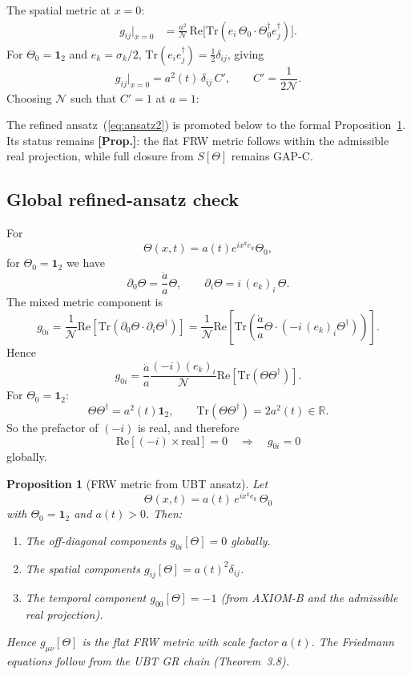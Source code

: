 \documentclass[12pt,a4paper]{article}
\newtheorem{proposition}[theorem]{Proposition}
\begin{document}
The spatial metric at $x = 0$:
\begin{align}
  g_{ij}\big|_{x=0}
  &= \frac{a^2}{\mathcal{N}}\,
  \mathrm{Re}\bigl[\mathrm{Tr}(e_i\,\Theta_0\cdot\Theta_0^\dagger e_j^\dagger)\bigr].
\end{align}
For $\Theta_0 = \mathbf{1}_2$ and $e_k = \sigma_k/2$,
$\mathrm{Tr}(e_i e_j^\dagger) = \frac{1}{2}\delta_{ij}$, giving
\begin{equation}
  g_{ij}\big|_{x=0} = a^2(t)\,\delta_{ij}\,C', \qquad
  C' = \frac{1}{2\mathcal{N}}.
\end{equation}
Choosing $\mathcal{N}$ such that $C'=1$ at $a=1$:

\begin{propbox}
The refined ansatz~(\ref{eq:ansatz2}) is promoted below to the formal
Proposition~\ref{prop:frw}.  Its status remains \textbf{[Prop.]}:
the flat FRW metric follows within the admissible real projection, while
full closure from $S[\Theta]$ remains GAP-C.
\end{propbox}

\subsection{Global refined-ansatz check}

For
\[
\Theta(x,t)=a(t)e^{ix^k e_k}\Theta_0,
\]
for $\Theta_0=\mathbf{1}_2$ we have
\[
\partial_0\Theta=\frac{\dot a}{a}\Theta,\qquad
\partial_i\Theta=i\,(e_k)_i\,\Theta.
\]
The mixed metric component is
\[
g_{0i}
=\frac{1}{\mathcal N}
\mathrm{Re}\!\left[\mathrm{Tr}\!\left(\partial_0\Theta\cdot\partial_i\Theta^\dagger\right)\right]
=\frac{1}{\mathcal N}
\mathrm{Re}\!\left[\mathrm{Tr}\!\left(
\frac{\dot a}{a}\Theta\cdot\left(-i\,(e_k)_i\Theta^\dagger\right)\right)\right].
\]
Hence
\[
g_{0i}
=\frac{\dot a}{a}\frac{(-i)(e_k)_i}{\mathcal N}
\mathrm{Re}\!\left[\mathrm{Tr}(\Theta\Theta^\dagger)\right].
\]
For $\Theta_0=\mathbf{1}_2$:
\[
\Theta\Theta^\dagger=a^2(t)\mathbf{1}_2,\qquad
\mathrm{Tr}(\Theta\Theta^\dagger)=2a^2(t)\in\mathbb R.
\]
So the prefactor of $(-i)$ is real, and therefore
\[
\mathrm{Re}\!\left[(-i)\times\text{real}\right]=0
\quad\Longrightarrow\quad
g_{0i}=0
\]
globally.

\begin{proposition}[FRW metric from UBT ansatz]
\label{prop:frw}
Let
\[
\Theta(x,t)=a(t)\,e^{ix^k e_k}\,\Theta_0
\]
with $\Theta_0=\mathbf{1}_2$ and $a(t)>0$. Then:
\begin{enumerate}
\item The off-diagonal components $g_{0i}[\Theta]=0$ globally.
\item The spatial components $g_{ij}[\Theta]=a(t)^2\delta_{ij}$.
\item The temporal component $g_{00}[\Theta]=-1$
      (from AXIOM-B and the admissible real projection).
\end{enumerate}
Hence $g_{\mu\nu}[\Theta]$ is the flat FRW metric with scale factor $a(t)$.
The Friedmann equations follow from the UBT GR chain (Theorem~3.8).
\end{proposition}
\end{document}
